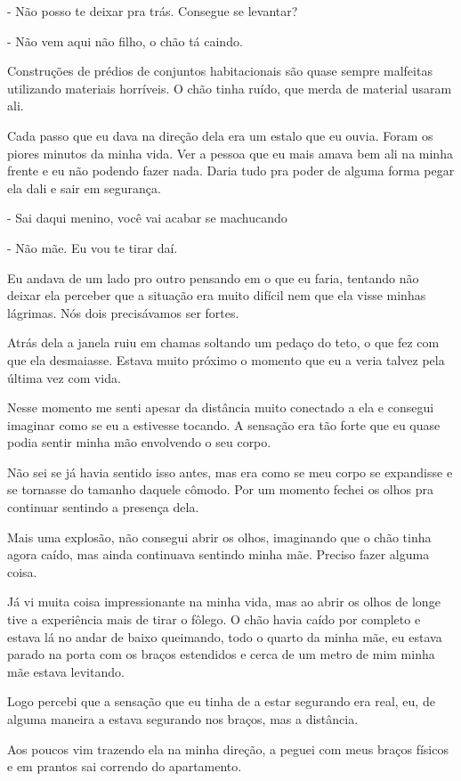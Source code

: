 - Não posso te deixar pra trás. Consegue se levantar?

- Não vem aqui não filho, o chão tá caindo.

Construções de prédios de conjuntos habitacionais são quase sempre malfeitas utilizando materiais horríveis. O chão tinha ruído, que merda de material usaram ali.

Cada passo que eu dava na direção dela era um estalo que eu ouvia. Foram os piores minutos da minha vida. Ver a pessoa que eu mais amava bem ali na minha frente e eu não podendo fazer nada. Daria tudo pra poder de alguma forma pegar ela dali e sair em segurança.

- Sai daqui menino, você vai acabar se machucando

- Não mãe. Eu vou te tirar daí.

Eu andava de um lado pro outro pensando em o que eu faria, tentando não deixar ela perceber que a situação era muito difícil nem que ela visse minhas lágrimas. Nós dois precisávamos ser fortes.

Atrás dela a janela ruiu em chamas soltando um pedaço do teto, o que fez com que ela desmaiasse. Estava muito próximo o momento que eu a veria talvez pela última vez com vida.

Nesse momento me senti apesar da distância muito conectado a ela e consegui imaginar como se eu a estivesse tocando. A sensação era tão forte que eu quase podia sentir minha mão envolvendo o seu corpo.

Não sei se já havia sentido isso antes, mas era como se meu corpo se expandisse e se tornasse do tamanho daquele cômodo. Por um momento fechei os olhos pra continuar sentindo a presença dela.

Mais uma explosão, não consegui abrir os olhos, imaginando que o chão tinha agora caído, mas ainda continuava sentindo minha mãe. Preciso fazer alguma coisa.

Já vi muita coisa impressionante na minha vida, mas ao abrir os olhos de longe tive a experiência mais de tirar o fôlego. O chão havia caído por completo e estava lá no andar de baixo queimando, todo o quarto da minha mãe, eu estava parado na porta com os braços estendidos e cerca de um metro de mim minha mãe estava levitando.

Logo percebi que a sensação que eu tinha de a estar segurando era real, eu, de alguma maneira a estava segurando nos braços, mas a distância.

Aos poucos vim trazendo ela na minha direção, a peguei com meus braços físicos e em prantos sai correndo do apartamento.

